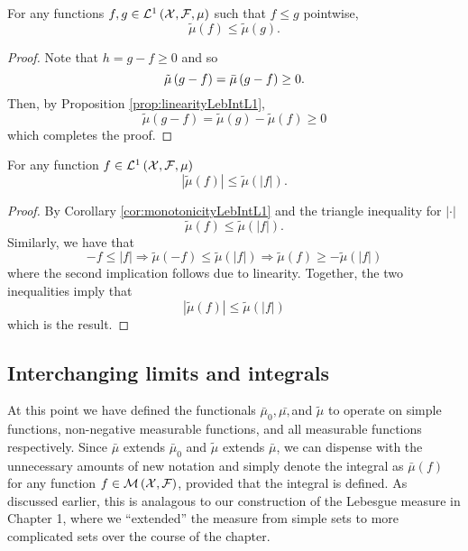 \begin{cor}
\label{cor:monotonicityLebIntL1}For any functions $f,g\in\mathcal{L}^{1}\left(\mathcal{X},\mathcal{F},\mu\right)$
such that $f\leq g$ pointwise,
\[
\tilde{\mu}\left(f\right)\leq\tilde{\mu}\left(g\right).
\]
\end{cor}

\begin{proof}
Note that $h=g-f\geq0$ and so 
\[
\tilde{\mu}\left(g-f\right)=\bar{\mu}\left(g-f\right)\geq0.
\]
Then, by Proposition \ref{prop:linearityLebIntL1}, 
\[
\tilde{\mu}\left(g-f\right)=\tilde{\mu}\left(g\right)-\tilde{\mu}\left(f\right)\geq0
\]
which completes the proof.
\end{proof}
\begin{cor}
\label{cor:triangleIneqLebIntL1}For any function $f\in\mathcal{L}^{1}\left(\mathcal{X},\mathcal{F},\mu\right)$
\[
\left|\tilde{\mu}\left(f\right)\right|\leq\tilde{\mu}\left(\left|f\right|\right).
\]
\end{cor}

\begin{proof}
By Corollary \ref{cor:monotonicityLebIntL1} and the triangle inequality
for $\left|\cdot\right|$
\[
\tilde{\mu}\left(f\right)\leq\tilde{\mu}\left(\left|f\right|\right).
\]
Similarly, we have that
\[
-f\leq\left|f\right|\Longrightarrow\tilde{\mu}\left(-f\right)\leq\tilde{\mu}\left(\left|f\right|\right)\Longrightarrow\tilde{\mu}\left(f\right)\geq-\tilde{\mu}\left(\left|f\right|\right)
\]
where the second implication follows due to linearity. Together, the
two inequalities imply that
\[
\left|\tilde{\mu}\left(f\right)\right|\leq\tilde{\mu}\left(\left|f\right|\right)
\]
which is the result.
\end{proof}

\subsection{Interchanging limits and integrals}

At this point we have defined the functionals $\bar{\mu}_{0},\bar{\mu,}$and
$\tilde{\mu}$ to operate on simple functions, non-negative measurable
functions, and all measurable functions respectively. Since $\bar{\mu}$
extends $\bar{\mu}_{0}$ and $\tilde{\mu}$ extends $\bar{\mu}$,
we can dispense with the unnecessary amounts of new notation and simply
denote the integral as $\bar{\mu}\left(f\right)$ for any function
$f\in\mathcal{M}\left(\mathcal{X},\mathcal{F}\right)$, provided that the integral is defined.
As discussed earlier, this is analagous to our construction of the
Lebesgue measure in Chapter 1, where we ``extended'' the measure
from simple sets to more complicated sets over the course of the chapter.


